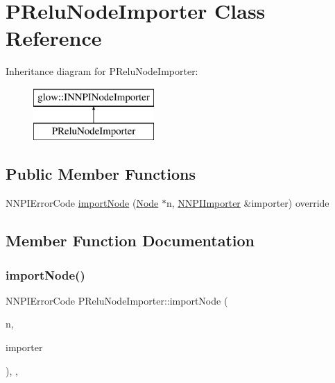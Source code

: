 \hypertarget{class_p_relu_node_importer}{}\section{P\+Relu\+Node\+Importer Class Reference}
\label{class_p_relu_node_importer}
Inheritance diagram for P\+Relu\+Node\+Importer\+:\begin{figure}[H]
\begin{center}
\leavevmode
\includegraphics[height=2.000000cm]{class_p_relu_node_importer}
\end{center}
\end{figure}
\subsection*{Public Member Functions}
\begin{DoxyCompactItemize}
\item 
N\+N\+P\+I\+Error\+Code \hyperlink{class_p_relu_node_importer_a06ec6bb0a02dc220c9f2b6ccf1ca2f8e}{import\+Node} (\hyperlink{classglow_1_1_node}{Node} $\ast$n, \hyperlink{classglow_1_1_n_n_p_i_importer}{N\+N\+P\+I\+Importer} \&importer) override
\end{DoxyCompactItemize}


\subsection{Member Function Documentation}
\mbox{\label{class_p_relu_node_importer_a06ec6bb0a02dc220c9f2b6ccf1ca2f8e}} 
\subsubsection{\texorpdfstring{import\+Node()}{importNode()}}
{\footnotesize\ttfamily N\+N\+P\+I\+Error\+Code P\+Relu\+Node\+Importer\+::import\+Node (\begin{DoxyParamCaption}\item[{\hyperlink{classglow_1_1_node}{Node} $\ast$}]{n,  }\item[{\hyperlink{classglow_1_1_n_n_p_i_importer}{N\+N\+P\+I\+Importer} \&}]{importer }\end{DoxyParamCaption})\hspace{0.3cm}{\ttfamily [inline]}, {\ttfamily [override]}, {\ttfamily [virtual]}}

